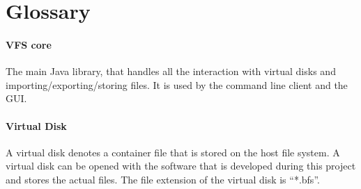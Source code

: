 \section{Glossary}

\paragraph{VFS core} The main Java library, that handles all the interaction
with virtual disks and importing/exporting/storing files. It is used by the
command line client and the GUI.

\paragraph{Virtual Disk} A virtual disk denotes a container file that is stored
on the host file system. A virtual disk can be opened with the software that is
developed during this project and stores the actual files. The file extension of
the virtual disk is ``*.bfs''.